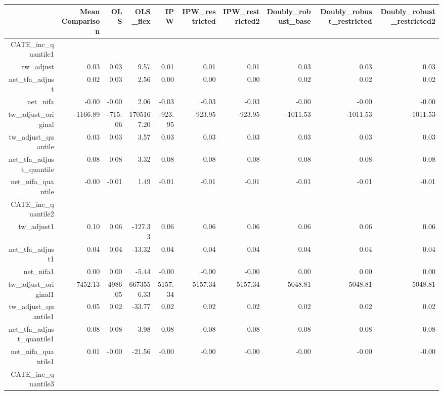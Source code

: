 \begin{table}[ht]
\centering
\begin{tabular}{rrrrrrrrrr}
  \hline
 & Mean Comparison & OLS & OLS\_flex & IPW & IPW\_restricted & IPW\_restricted2 & Doubly\_robust\_base & Doubly\_robust\_restricted & Doubly\_robust\_restricted2 \\ 
  \hline
CATE\_inc\_quantile1 &  &  &  &  &  &  &  &  &  \\ 
  tw\_adjust & 0.03 & 0.03 & 9.57 & 0.01 & 0.01 & 0.01 & 0.03 & 0.03 & 0.03 \\ 
  net\_tfa\_adjust & 0.02 & 0.03 & 2.56 & 0.00 & 0.00 & 0.00 & 0.02 & 0.02 & 0.02 \\ 
  net\_nifa & -0.00 & -0.00 & 2.06 & -0.03 & -0.03 & -0.03 & -0.00 & -0.00 & -0.00 \\ 
  tw\_adjust\_original & -1166.89 & -715.06 & 1705167.20 & -923.95 & -923.95 & -923.95 & -1011.53 & -1011.53 & -1011.53 \\ 
  tw\_adjust\_quantile & 0.03 & 0.03 & 3.57 & 0.03 & 0.03 & 0.03 & 0.03 & 0.03 & 0.03 \\ 
  net\_tfa\_adjust\_quantile & 0.08 & 0.08 & 3.32 & 0.08 & 0.08 & 0.08 & 0.08 & 0.08 & 0.08 \\ 
  net\_nifa\_quantile & -0.00 & -0.01 & 1.49 & -0.01 & -0.01 & -0.01 & -0.01 & -0.01 & -0.01 \\ 
  CATE\_inc\_quantile2 &  &  &  &  &  &  &  &  &  \\ 
  tw\_adjust1 & 0.10 & 0.06 & -127.33 & 0.06 & 0.06 & 0.06 & 0.06 & 0.06 & 0.06 \\ 
  net\_tfa\_adjust1 & 0.04 & 0.04 & -13.32 & 0.04 & 0.04 & 0.04 & 0.04 & 0.04 & 0.04 \\ 
  net\_nifa1 & 0.00 & 0.00 & -5.44 & -0.00 & -0.00 & -0.00 & 0.00 & 0.00 & 0.00 \\ 
  tw\_adjust\_original1 & 7452.13 & 4986.05 & 6673556.33 & 5157.34 & 5157.34 & 5157.34 & 5048.81 & 5048.81 & 5048.81 \\ 
  tw\_adjust\_quantile1 & 0.05 & 0.02 & -33.77 & 0.02 & 0.02 & 0.02 & 0.02 & 0.02 & 0.02 \\ 
  net\_tfa\_adjust\_quantile1 & 0.08 & 0.08 & -3.98 & 0.08 & 0.08 & 0.08 & 0.08 & 0.08 & 0.08 \\ 
  net\_nifa\_quantile1 & 0.01 & -0.00 & -21.56 & -0.00 & -0.00 & -0.00 & -0.00 & -0.00 & -0.00 \\ 
  CATE\_inc\_quantile3 &  &  &  &  &  &  &  &  &  \\ 

\end{tabular}
\end{table}
